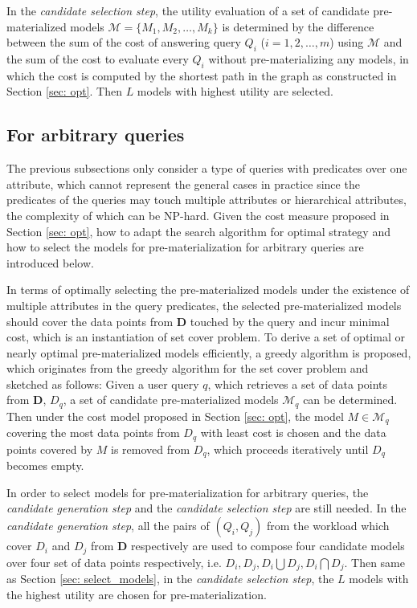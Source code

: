 In the {\em candidate selection step}, the utility evaluation of a set of candidate pre-materialized models $\mathcal{M} = \{M_1, M_2, \dots, M_k\}$ is determined by the difference between the sum of the cost of answering query $Q_i$ ($i=1,2,\dots, m$) using $\mathcal{M}$ and the sum of the cost to evaluate every $Q_i$ without pre-materializing any models, in which the cost is computed by the shortest path in the graph as constructed in Section \ref{sec: opt}. Then $L$ models with highest utility are selected.

\subsection{For arbitrary queries}
The previous subsections only consider a type of queries with predicates over one attribute, which cannot represent the general cases in practice since the predicates of the queries may touch multiple attributes or hierarchical attributes, the complexity of which can be NP-hard. Given the cost measure proposed in Section \ref{sec: opt}, how to adapt the search algorithm for optimal strategy and how to select the models for pre-materialization for arbitrary queries are introduced below.

In terms of optimally selecting the pre-materialized models under the existence of multiple attributes in the query predicates, the selected pre-materialized models should cover the data points from $\textbf{D}$ touched by the query and incur minimal cost, which is an instantiation of set cover problem. To derive a set of optimal or nearly optimal pre-materialized models efficiently, a greedy algorithm is proposed, which originates from the greedy algorithm for the set cover problem and sketched as follows: Given a user query $q$, which retrieves a set of data points from $\textbf{D}$, $D_q$, a set of candidate pre-materialized models $\mathcal{M}_q$ can be determined. Then under the cost model proposed in Section \ref{sec: opt}, the model $M \in \mathcal{M}_q$ covering the most data points from $D_q$ with least cost is chosen and the data points covered by $M$ is removed from $D_q$, which proceeds iteratively until $D_q$ becomes empty.

In order to select models for pre-materialization for arbitrary queries, the {\em candidate generation step} and the {\em candidate selection step} are still needed. In the {\em candidate generation step}, all the pairs of $(Q_i, Q_j)$ from the workload which cover $D_i$ and $D_j$ from $\textbf{D}$ respectively are used to compose four candidate models over four set of data points respectively, i.e. $D_i, D_j, D_i \bigcup D_j, D_i \bigcap D_j$. Then same as Section \ref{sec: select_models}, in the {\em candidate selection step}, the $L$ models with the highest utility are chosen for pre-materialization.

